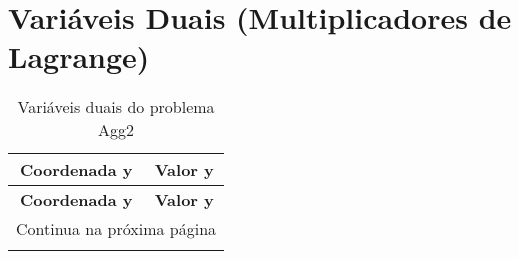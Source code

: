 \documentclass[12pt]{article}
\begin{document}
\section{Variáveis Duais (Multiplicadores de Lagrange)}

\begin{longtable}{@{}cc@{}}
\caption{Variáveis duais do problema Agg2} \\
\toprule
\textbf{Coordenada y} & \textbf{Valor y} \\
\midrule
\endfirsthead

\toprule
\textbf{Coordenada y} & \textbf{Valor y} \\
\midrule
\endhead

\midrule \multicolumn{2}{r}{{Continua na próxima página}} \\ \midrule
\endfoot


\end{longtable}
\end{document}
